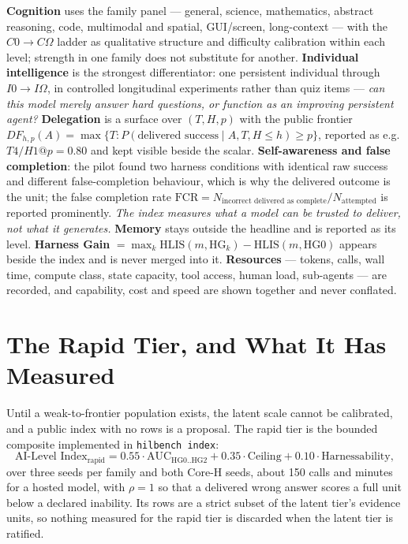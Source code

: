 \textbf{Cognition} uses the family panel --- general, science, mathematics, abstract reasoning, code, multimodal and spatial, GUI/screen, long-context --- with the $C0 \to C\Omega$ ladder as qualitative structure and difficulty calibration within each level; strength in one family does not substitute for another. \textbf{Individual intelligence} is the strongest differentiator: one persistent individual through $I0 \to I\Omega$, in controlled longitudinal experiments rather than quiz items --- \emph{can this model merely answer hard questions, or function as an improving persistent agent?} \textbf{Delegation} is a surface over $(T, H, p)$ with the public frontier $DF_{h,p}(A) = \max\{T : P(\text{delivered success} \mid A, T, H \le h) \ge p\}$, reported as e.g. $T4/H1@p{=}0.80$ and kept visible beside the scalar. \textbf{Self-awareness and false completion}: the pilot found two harness conditions with identical raw success and different false-completion behaviour, which is why the delivered outcome is the unit; the false completion rate $\mathrm{FCR} = N_{\text{incorrect delivered as complete}} / N_{\text{attempted}}$ is reported prominently. \emph{The index measures what a model can be trusted to deliver, not what it generates.} \textbf{Memory} stays outside the headline and is reported as its level. \textbf{Harness Gain} $= \max_k \text{HLIS}(m, \mathrm{HG}_k) - \text{HLIS}(m, \mathrm{HG0})$ appears beside the index and is never merged into it. \textbf{Resources} --- tokens, calls, wall time, compute class, state capacity, tool access, human load, sub-agents --- are recorded, and capability, cost and speed are shown together and never conflated.

\section{The Rapid Tier, and What It Has Measured}\label{sec:rapid}

Until a weak-to-frontier population exists, the latent scale cannot be calibrated, and a public index with no rows is a proposal. The rapid tier is the bounded composite implemented in \texttt{hilbench index}:
\[
\text{AI-Level Index}_{\mathrm{rapid}} = 0.55\cdot\mathrm{AUC}_{\mathrm{HG0..HG2}} + 0.35\cdot\mathrm{Ceiling} + 0.10\cdot\mathrm{Harnessability},
\]
over three seeds per family and both Core-H seeds, about 150 calls and minutes for a hosted model, with $\rho = 1$ so that a delivered wrong answer scores a full unit below a declared inability. Its rows are a strict subset of the latent tier's evidence units, so nothing measured for the rapid tier is discarded when the latent tier is ratified.

